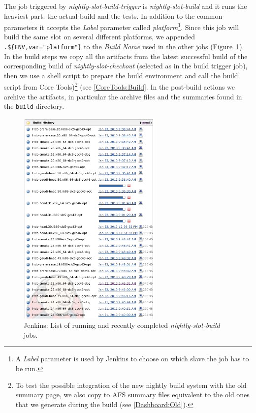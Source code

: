 \documentclass{lhcbnote}
\begin{document}
The job triggered by \emph{nightly-slot-build-trigger} is
\emph{nightly-slot-build} and it runs the heaviest part: the actual build and
the tests.  In addition to the common parameters it accepts the \emph{Label}
parameter called \emph{platform}\footnote{A \emph{Label} parameter is used by
Jenkins to choose on which slave the job has to be run.}.  Since this job will
build the same slot on several different platforms, we appended
\verb|.${ENV,var="platform"}| to the \emph{Build Name} used in the other jobs
(Figure~\ref{fig:jenkins-builds}).  In the build steps we copy all the artifacts
from the latest successful build of the corresponding build of
\emph{nightly-slot-checkout} (selected as in the build trigger job), then we use
a shell script to prepare the build environment and call the build script from
Core Tools)\footnote{To test the possible integration of the new nightly build
  system with the old summary page, we also copy to AFS summary files equivalent
  to the old ones that we generate during the build (see \ref{Dashboard:Old}).}
(see \ref{CoreTools:Build}. In the post-build actions we archive the artifacts,
in particular the archive files and the summaries found in the \texttt{build}
directory.

\begin{figure}[t]
  \begin{center}
    \includegraphics[width=7cm]{images/jenkins-3}
  \end{center}
  \caption{Jenkins: List of running and recently completed
  \emph{nightly-slot-build} jobs.}
  \label{fig:jenkins-builds}
\end{figure}
\end{document}
